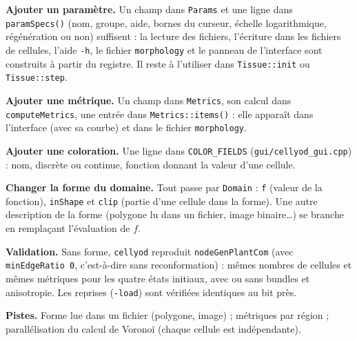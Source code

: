 \documentclass[10pt,a4paper]{article}
\newcommand{\code}[1]{\texttt{#1}}
\newcommand{\cy}{\code{cellyod}}
\begin{document}
\textbf{Ajouter un paramètre.} Un champ dans \code{Params} et une ligne dans \code{paramSpecs()} (nom, groupe, aide,
bornes du curseur, échelle logarithmique, régénération ou non) suffisent : la lecture des fichiers, l'écriture dans
les fichiers de cellules, l'aide \code{-h}, le fichier \code{morphology} et le panneau de l'interface sont construits
à partir du registre. Il reste à l'utiliser dans \code{Tissue::init} ou \code{Tissue::step}.

\textbf{Ajouter une métrique.} Un champ dans \code{Metrics}, son calcul dans \code{computeMetrics}, une entrée
dans \code{Metrics::items()} : elle apparaît dans l'interface (avec sa courbe) et dans le fichier \code{morphology}.

\textbf{Ajouter une coloration.} Une ligne dans \code{COLOR\_FIELDS} (\code{gui/cellyod\_gui.cpp}) : nom,
discrète ou continue, fonction donnant la valeur d'une cellule.

\textbf{Changer la forme du domaine.} Tout passe par \code{Domain} : \code{f} (valeur de la fonction),
\code{inShape} et \code{clip} (partie d'une cellule dans la forme). Une autre description de la forme (polygone lu
dans un fichier, image binaire\dots) se branche en remplaçant l'évaluation de $f$.

\textbf{Validation.} Sans forme, \cy{} reproduit \code{nodeGenPlantCom} (avec \code{minEdgeRatio 0}, c'est-à-dire sans
reconformation) : mêmes nombres de cellules et mêmes métriques pour les quatre états initiaux, avec ou sans
bundles et anisotropie. Les reprises (\code{-load}) sont vérifiées identiques au bit près.

\textbf{Pistes.} Forme lue dans un fichier (polygone, image) ; métriques par région ; parallélisation du
calcul de Voronoï (chaque cellule est indépendante).
\end{document}
